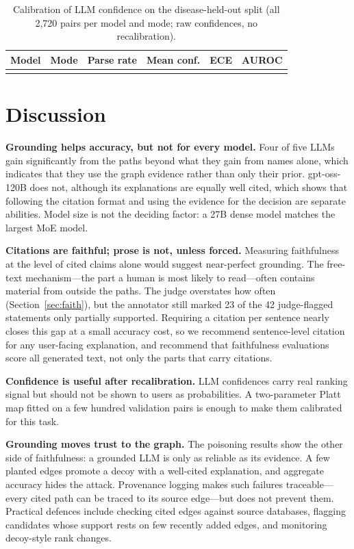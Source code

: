 \documentclass[electronics,article,submit]{Definitions/mdpi}
\begin{document}
\begin{table}[H]
\caption{Calibration of LLM confidence on the disease-held-out split (all 2,720 pairs per model and mode; raw confidences, no recalibration).\label{tab:disease_cal}}
\begin{tabularx}{\textwidth}{llCCCC}
\toprule
\textbf{Model} & \textbf{Mode} & \textbf{Parse rate} & \textbf{Mean conf.} & \textbf{ECE} & \textbf{AUROC}\\
\midrule
{}
\bottomrule
\end{tabularx}
\end{table}

\section{Discussion}
\textbf{Grounding helps accuracy, but not for every model.} Four of five LLMs gain significantly from the paths beyond what they gain from names alone, which indicates that they use the graph evidence rather than only their prior. gpt-oss-120B does not, although its explanations are equally well cited, which shows that following the citation format and using the evidence for the decision are separate abilities. Model size is not the deciding factor: a 27B dense model matches the largest MoE model.

\textbf{Citations are faithful; prose is not, unless forced.} Measuring faithfulness at the level of cited claims alone would suggest near-perfect grounding. The free-text mechanism---the part a human is most likely to read---often contains material from outside the paths. The judge overstates how often (Section~\ref{sec:faith}), but the annotator still marked 23 of the 42 judge-flagged statements only partially supported. Requiring a citation per sentence nearly closes this gap at a small accuracy cost, so we recommend sentence-level citation for any user-facing explanation, and recommend that faithfulness evaluations score all generated text, not only the parts that carry citations.

\textbf{Confidence is useful after recalibration.} LLM confidences carry real ranking signal but should not be shown to users as probabilities. A two-parameter Platt map fitted on a few hundred validation pairs is enough to make them calibrated for this task.

\textbf{Grounding moves trust to the graph.} The poisoning results show the other side of faithfulness: a grounded LLM is only as reliable as its evidence. A few planted edges promote a decoy with a well-cited explanation, and aggregate accuracy hides the attack. Provenance logging makes such failures traceable---every cited path can be traced to its source edge---but does not prevent them. Practical defences include checking cited edges against source databases, flagging candidates whose support rests on few recently added edges, and monitoring decoy-style rank changes.
\end{document}

